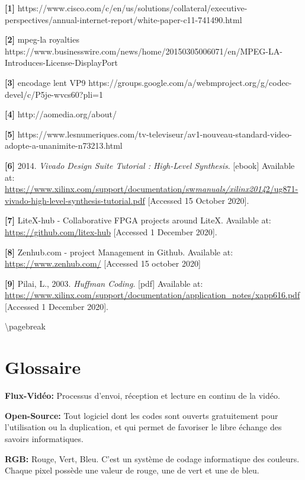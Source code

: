 \documentclass[
  french,
]{article}
\begin{document}
\textbf{{[}1{]}}
https://www.cisco.com/c/en/us/solutions/collateral/executive-perspectives/annual-internet-report/white-paper-c11-741490.html

\textbf{{[}2{]}} mpeg-la royalties
https://www.businesswire.com/news/home/20150305006071/en/MPEG-LA-Introduces-License-DisplayPort

\textbf{{[}3{]}} encodage lent VP9
https://groups.google.com/a/webmproject.org/g/codec-devel/c/P5je-wvcs60?pli=1

\textbf{{[}4{]}} http://aomedia.org/about/

\textbf{{[}5{]}}
https://www.lesnumeriques.com/tv-televiseur/av1-nouveau-standard-video-adopte-a-unanimite-n73213.html

\textbf{{[}6{]}} 2014. \emph{Vivado Design Suite Tutorial : High-Level
Synthesis}. {[}ebook{]} Available at:
\href{https://www.xilinx.com/support/documentation/sw_manuals/xilinx2014_2/ug871-vivado-high-level-synthesis-tutorial.pdf}{https://www.xilinx.com/support/documentation/sw\emph{manuals/xilinx2014}2/ug871-vivado-high-level-synthesis-tutorial.pdf}
{[}Accessed 15 October 2020{]}.

\textbf{{[}7{]}} LiteX-hub - Collaborative FPGA projects around LiteX.
Available at: \url{https://github.com/litex-hub} {[}Accessed 1 December
2020{]}.

\textbf{{[}8{]}} Zenhub.com - project Management in Github. Available
at: \url{https://www.zenhub.com/} {[}Accessed 15 october 2020{]}

\textbf{{[}9{]}} Pilai, L., 2003. \emph{Huffman Coding}. {[}pdf{]}
Available at:
\url{https://www.xilinx.com/support/documentation/application_notes/xapp616.pdf}
{[}Accessed 1 December 2020{]}.

\textbackslash pagebreak

\hypertarget{header-n54}{%
\section{Glossaire}\label{header-n54}}

\textbf{Flux-Vidéo:} Processus d'envoi, réception et lecture en continu
de la vidéo.

\textbf{Open-Source:} Tout logiciel dont les codes sont ouverts
gratuitement pour l'utilisation ou la duplication, et qui permet de
favoriser le libre échange des savoirs informatiques.

\textbf{RGB:} Rouge, Vert, Bleu. C'est un système de codage informatique
des couleurs. Chaque pixel possède une valeur de rouge, une de vert et
une de bleu.
\end{document}
